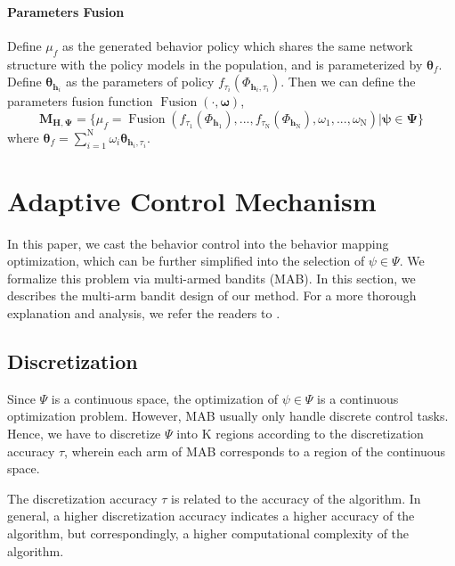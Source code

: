 \paragraph{Parameters Fusion} 
Define $\mu_f$ as the generated behavior policy which shares the same network structure with the policy models in the population, and is parameterized by $\bm{\theta}_f$. Define $\bm{\theta}_{\mathbf{h}_i}$ as the parameters of policy $f_{\tau_i}(\Phi_{\mathbf{h}_i, \tau_i})$. Then we can define the parameters fusion function $\operatorname{Fusion}(\cdot,\bm{\omega})$,
\begin{equation}
\mathbf{M}_{\mathbf{H},\bm{\Psi}} = \{\mu_f =\operatorname{Fusion}(f_{\tau_1} (\Phi_{\mathbf{h}_1}),..., f_{\tau_{\mathrm{N}}}( \Phi_{\mathbf{h}_{\mathrm{N}}}), \omega_1,...,\omega_{\mathrm{N}}) | \bm{\psi}\in\bm{\Psi} \}
\end{equation}
where $\bm{\theta}_f=\sum_{i=1}^{\mathrm{N}} \omega_i\bm{\theta}_{\mathbf{h}_i, \tau_i} $.

\clearpage
\section{Adaptive Control Mechanism}
\label{Sec: appendix MAB}

In this paper, we cast the behavior control into the behavior mapping optimization, which can be further simplified into the selection of $\psi \in \Psi$. We formalize this problem via multi-armed bandits (MAB).  In this section, we describes  the multi-arm bandit design of our method. For a more thorough explanation and analysis, we refer the readers to \citep{garivier2008upper}.




 
\subsection{Discretization}
Since $\Psi$ is a continuous space, the optimization of $\psi \in \Psi$ is a  continuous optimization problem.  However, MAB usually only handle discrete control tasks. Hence, we have to discretize $\Psi$ into $\mathrm{K}$ regions according to the discretization accuracy $\tau$, wherein each arm of MAB corresponds to a region of the continuous space. 

\begin{Remark}
    The discretization accuracy $\tau$  is related to the accuracy of the algorithm. In general, a higher discretization accuracy indicates a higher accuracy of the algorithm, but correspondingly, a higher computational complexity of the algorithm.
\end{Remark}

